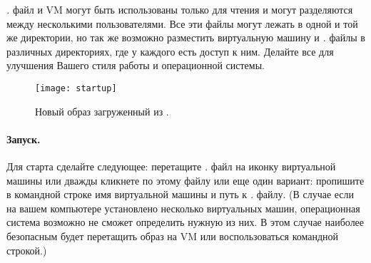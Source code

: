 \documentclass[a4paper,10pt,twoside]{book}
\begin{document}

\emph{.} файл и VM могут быть использованы
только для чтения и могут разделяются между несколькими
пользователями. Все эти файлы могут лежать в одной и той же
директории, но так же возможно разместить виртуальную машину и
\emph{.} файлы в различных директориях,
где у каждого есть доступ к ним. Делайте все для
улучшения Вашего стиля работы и операционной системы.


\begin{figure}[htb]
\centerline {\texttt{[image: startup]}}
\caption{Новый образ загруженный из \pbe. }
\end{figure}


\paragraph{Запуск.} Для старта \pharo сделайте следующее:
перетащите \emph{.} файл на иконку виртуальной
машины или дважды кликнете по этому файлу или еще один вариант:
пропишите в командной строке имя виртуальной машины и путь
к \emph{.} файлу. (В случае если на
вашем компьютере установлено несколько виртуальных машин,
операционная система возможно не сможет определить нужную из них.
В этом случае наиболее безопасным будет перетащить
образ на VM или воспользоваться командной строкой.)
\end{document}
